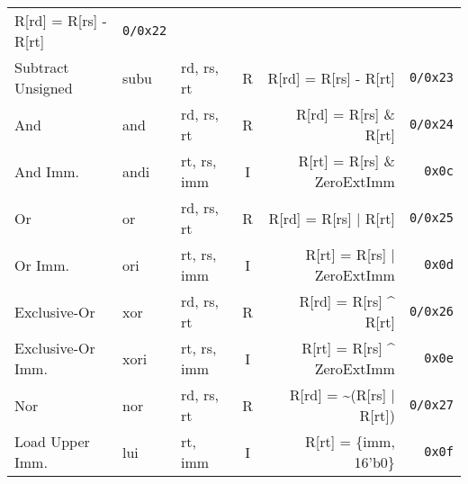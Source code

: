 \begin{tabularx}{\textwidth}{lMAcDr}
    R[rd] = R[rs] - R[rt]                          \footnotemark[1]                 & \texttt{0/0x22}                       \\
    Subtract Unsigned                                                               & subu   & rd, rs, rt    & R &
    R[rd] = R[rs] - R[rt]                                                           & \texttt{0/0x23}                       \\
    And                                                                             & and    & rd, rs, rt    & R &
    R[rd] = R[rs] \& R[rt]                                                          & \texttt{0/0x24}                       \\
    And Imm.                                                                        & andi   & rt, rs, imm   & I &
    R[rt] = R[rs] \& ZeroExtImm                    \footnotemark[3]                 & \texttt{0x0c}                       \\
    Or                                                                              & or     & rd, rs, rt    & R &
    R[rd] = R[rs] | R[rt]                                                           & \texttt{0/0x25}                       \\
    Or Imm.                                                                         & ori    & rt, rs, imm   & I &
    R[rt] = R[rs] | ZeroExtImm                     \footnotemark[3]                 & \texttt{0x0d}                       \\
    Exclusive-Or                                                                    & xor    & rd, rs, rt    & R &
    R[rd] = R[rs] \textasciicircum{} R[rt]                                          & \texttt{0/0x26}                       \\
    Exclusive-Or Imm.                                                               & xori   & rt, rs, imm   & I &
    R[rt] = R[rs] \textasciicircum{} ZeroExtImm    \footnotemark[3]                 & \texttt{0x0e}                       \\
    Nor                                                                             & nor    & rd, rs, rt    & R &
    R[rd] = \textasciitilde (R[rs] | R[rt])                                         & \texttt{0/0x27}                       \\
    Load Upper Imm.                                                                 & lui    & rt, imm       & I &
    R[rt] = \{imm, 16'b0\}                                                          & \texttt{0x0f}                       \\

\end{tabularx}
